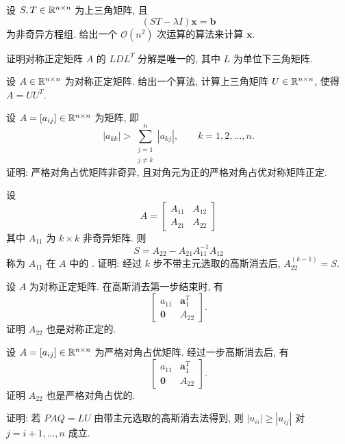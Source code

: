 \begin{exercises}
  \item 设 $S,T\in\mathbb{R}^{n\times n}$ 为上三角矩阵, 且
  \[
    (ST-\lambda I)\mathbf{x}=\mathbf{b}
  \]
  为非奇异方程组. 给出一个 $\mathcal{O}(n^2)$ 次运算的算法来计算 $\mathbf{x}$.

  \item 证明对称正定矩阵 $A$ 的 $LDL^T$ 分解是唯一的, 其中 $L$ 为单位下三角矩阵.

  \item 设 $A\in\mathbb{R}^{n\times n}$ 为对称正定矩阵. 给出一个算法, 计算上三角矩阵 $U\in\mathbb{R}^{n\times n}$, 使得 $A=UU^T$.

  \item 设 $A=[a_{ij}]\in\mathbb{R}^{n\times n}$ 为矩阵, 即
  \[
    |a_{kk}|>\sum_{\substack{j=1\\ j\neq k}}^{n}|a_{kj}|,\qquad k=1,2,\ldots,n.
  \]
  证明: 严格对角占优矩阵非奇异, 且对角元为正的严格对角占优对称矩阵正定.

  \item 设
  \[
    A=
    \begin{bmatrix}
      A_{11} & A_{12}\\
      A_{21} & A_{22}
    \end{bmatrix}
  \]
  其中 $A_{11}$ 为 $k\times k$ 非奇异矩阵. 则
  \[
    S=A_{22}-A_{21}A_{11}^{-1}A_{12}
  \]
  称为 $A_{11}$ 在 $A$ 中的 . 证明: 经过 $k$ 步不带主元选取的高斯消去后, $A_{22}^{(k-1)}=S$.

  \item 设 $A$ 为对称正定矩阵. 在高斯消去第一步结束时, 有
  \[
    \begin{bmatrix}
      a_{11} & \mathbf{a}_1^T\\
      \mathbf{0} & A_{22}
    \end{bmatrix}.
  \]
  证明 $A_{22}$ 也是对称正定的.

  \item 设 $A=[a_{ij}]\in\mathbb{R}^{n\times n}$ 为严格对角占优矩阵. 经过一步高斯消去后, 有
  \[
    \begin{bmatrix}
      a_{11} & \mathbf{a}_1^T\\
      \mathbf{0} & A_{22}
    \end{bmatrix}.
  \]
  证明 $A_{22}$ 也是严格对角占优的.

  \item 证明: 若 $PAQ=LU$ 由带主元选取的高斯消去法得到, 则 $|u_{ii}|\geqslant|u_{ij}|$ 对 $j=i+1,\ldots,n$ 成立.


\end{exercises}
